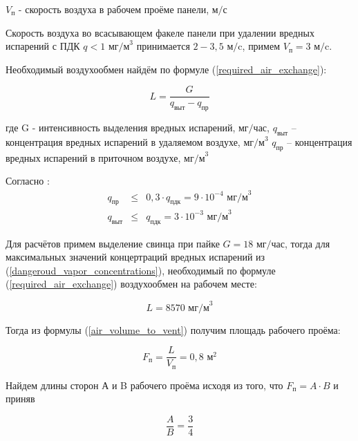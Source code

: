 $V_\text{п}$ - скорость воздуха в рабочем проёме панели, $\text{м/с}$

Скорость воздуха во всасывающем факеле панели при удалении вредных испарений с
ПДК $q < 1$ $\text{мг/м}^3$ \cite[табл. 1.1]{local_vent_spot_calc_method} принимается
$2 - 3,5 \text{ м/c}$, примем $V_\text{п} = 3 \text{ м/c}$.

Необходимый воздухообмен найдём по формуле (\ref{required_air_exchange}):

\begin{equation}
\label{required_air_exchange}
    L = \frac{G}{q_\text{выт} - q_\text{пр}}
\end{equation}

где G - интенсивность выделения вредных испарений, $\text{мг/час}$,
$q_\text{выт}$ – концентрация вредных испарений в удаляемом воздухе, $\text{мг/м}^3$
$q_\text{пр}$ – концентрация вредных испарений в приточном воздухе, $\text{мг/м}^3$

Согласно \cite[п. 2.15]{ecology_san_norm_245_71}:
\begin{equation}
\label{dangeroud_vapor_concentrations}
    \begin{array}{lcr}
        q_\text{пр}  & \leq & 0,3 \cdot q_\text{пдк} = 9 \cdot 10^{-4} \text{ мг/м}^3 \\
        q_\text{выт} & \leq &           q_\text{пдк} = 3 \cdot 10^{-3} \text{ мг/м}^3
    \end{array}
\end{equation}

Для расчётов примем выделение свинца при пайке $G = 18 \text{ мг/час}$,
тогда для максимальных значений концертраций вредных испарений из
(\ref{dangeroud_vapor_concentrations}), необходимый по формуле (\ref{required_air_exchange})
воздухообмен на рабочем месте:

$$
    L = 8570 \text{ мг/м}^3
$$

Тогда из формулы (\ref{air_volume_to_vent}) получим площадь рабочего проёма:

\begin{equation}
\label{working_window_area}
    F_\text{п} = \frac{L}{V_\text{п}} = 0,8 \text{ м}^2
\end{equation}

Найдем длины сторон А и B рабочего проёма исходя из того, что $F_\text{п}  = A \cdot B$ и приняв

\begin{equation}
\label{working_window_area_sides_ratio}
    \frac{A}{B} = \frac{3}{4}
\end{equation}

